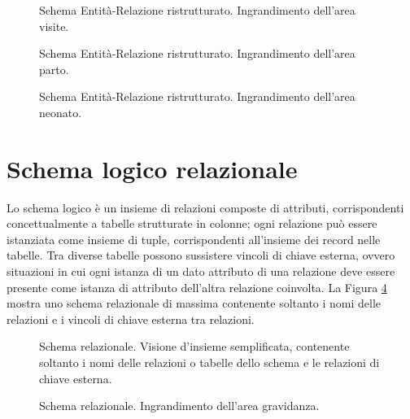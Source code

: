 \begin{figure}
    \centering
    
    \caption{Schema Entità-Relazione ristrutturato. Ingrandimento dell'area visite.}
\label{visitsrerdiagram}
\end{figure}

\begin{figure}
    \centering
    
    \caption{Schema Entità-Relazione ristrutturato. Ingrandimento dell'area parto.}
\label{deliveryrerdiagram}
\end{figure}

\begin{figure}
    \centering
    
    \caption{Schema Entità-Relazione ristrutturato. Ingrandimento dell'area neonato.}
\label{newbornrerdiagram}
\end{figure}

\newpage

\section{Schema logico relazionale}
\label{logical}

Lo schema logico è un insieme di relazioni composte di attributi, corrispondenti concettualmente a tabelle strutturate in colonne; ogni relazione può essere istanziata come insieme di tuple, corrispondenti all'insieme dei record nelle tabelle.
Tra diverse tabelle possono sussistere vincoli di chiave esterna, ovvero situazioni in cui ogni istanza di un dato attributo di una relazione deve essere presente come istanza di attributo dell'altra relazione coinvolta.
La Figura \ref{completereldiagram} mostra uno schema relazionale di massima contenente soltanto i nomi delle relazioni e i vincoli di chiave esterna tra relazioni.

\begin{figure}
    \centering
    
    \caption{Schema relazionale. Visione d'insieme semplificata, contenente soltanto i nomi delle relazioni o tabelle dello schema e le relazioni di chiave esterna.}
\label{completereldiagram}
\end{figure}

\begin{figure}
    \centering
    
    \caption{Schema relazionale. Ingrandimento dell'area gravidanza.}
\label{pregnancyreldiagram}
\end{figure}

